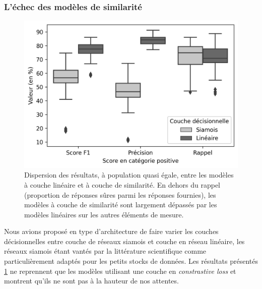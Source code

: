 \subsubsection{L’échec des modèles de similarité}

\begin{figure}[ht]
    \centering
    \includegraphics[width=.8\textwidth]{figures/chap4/SiameseVsLinear.png}
    \caption{Dispersion des résultats, à population quasi égale, entre les modèles à couche linéaire et à couche de similarité. En dehors du rappel (proportion de réponses sûres parmi les réponses fournies), les modèles à couche de similarité sont largement dépassés par les modèles linéaires sur les autres éléments de mesure.}
    \label{fig:chap4:modeles-siamois-vs-lineaires}
\end{figure}

Nous avions proposé en type d'architecture de faire varier les couches décisionnelles entre couche de réseaux siamois et couche en réseau linéaire, les réseaux siamois étant vantés par la littérature scientifique comme particulièrement adaptés pour les petits stocks de données. Les résultats présentés \ref{fig:chap4:modeles-siamois-vs-lineaires} ne reprennent que les modèles utilisant une couche en \textit{constrastive loss} et montrent qu'ils ne sont pas à la hauteur de nos attentes.


